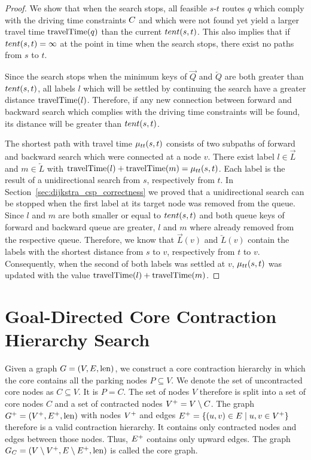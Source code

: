 \begin{proof}
	We show that when the search stops, all feasible $s$-$t$ routes $q$ which comply with the driving time constraints $C$ and which were not found yet yield a larger travel time $\operatorname{travelTime}(q)$ than the current $tent(s,t)$. This also implies that if $tent(s,t) = \infty$ at the point in time when the search stops, there exist no paths from $s$ to $t$.

	Since the search stops when the minimum keys of $\overrightarrow{Q}$ and $\overleftarrow{Q}$ are both greater than $tent(s,t)$, all labels $l$ which will be settled by continuing the search have a greater distance $\operatorname{travelTime}(l)$. Therefore, if any new connection between forward and backward search which complies with the driving time constraints will be found, its distance will be greater than $tent(s,t)$.

	The shortest path with travel time $\mu_{tt}(s,t)$ consists of two subpaths of forward and backward search which were connected at a node $v$. There exist label $l \in \overrightarrow{L}$ and $m \in \overleftarrow{L}$ with $\operatorname{travelTime}(l) + \operatorname{travelTime}(m) = \mu_{tt}(s,t)$. Each label is the result of a unidirectional search from $s$, respectively from $t$. In Section~\ref{sec:dijkstra_csp_correctness} we proved that a unidirectional search can be stopped when the first label at its target node was removed from the queue. Since $l$ and $m$ are both smaller or equal to $tent(s,t)$ and both queue keys of forward and backward queue are greater, $l$ and $m$ where already removed from the respective queue. Therefore, we know that $\overrightarrow{L}(v)$ and $\overleftarrow{L}(v)$ contain the labels with the shortest distance from $s$ to $v$, respectively from $t$ to $v$. Consequently, when the second of both labels was settled at $v$, $\mu_{tt}(s,t)$ was updated with the value $\operatorname{travelTime}(l) + \operatorname{travelTime}(m)$.
\end{proof}

\section{Goal-Directed Core Contraction Hierarchy Search\label{sec:astar_corech}}
Given a graph $G = (V,E,\operatorname{len})$, we construct a core contraction hierarchy in which the core contains all the parking nodes $P \subseteq V$. We denote the set of uncontracted core nodes as $C \subseteq V$. It is $P = C$. The set of nodes $V$ therefore is split into a set of core nodes $C$ and a set of contracted nodes $V^+ = V \setminus C$. The graph $G^+ = (V^+,E^+,\operatorname{len})$ with nodes $V^+$ and edges $E^+ = \{(u,v) \in E \mid u,v \in V^+\}$ therefore is a valid contraction hierarchy. It contains only contracted nodes and edges between those nodes. Thus, $E^+$ contains only upward edges. The graph $G_{C} = (V \setminus V^+,E \setminus E^+,\operatorname{len})$ is called the core graph.

